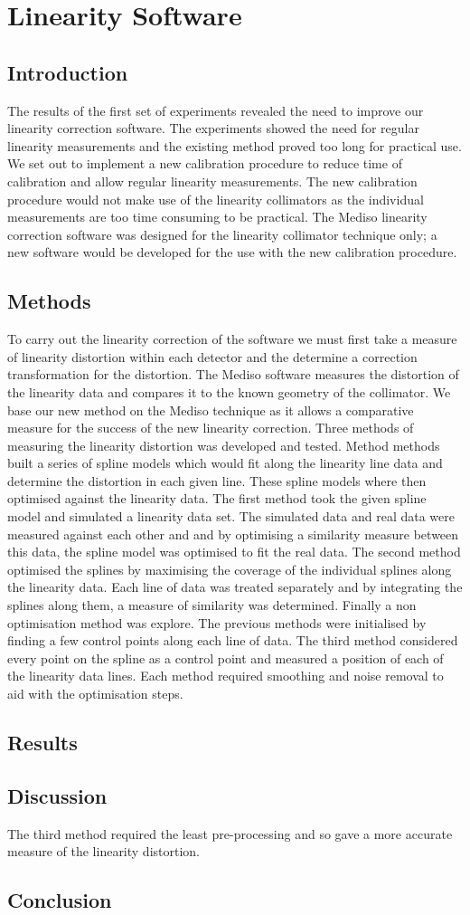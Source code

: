 \chapter{Linearity Software}
\label{chapterlabel}


\section{Introduction}
The results of the first set of experiments revealed the need to improve our linearity correction software. The experiments showed the need for regular linearity measurements and the existing method proved too long for practical use. We set out to implement a new calibration procedure to reduce time of calibration and allow regular linearity measurements. 
The new calibration procedure would not make use of the linearity collimators as the individual measurements are too time consuming to be practical. 
The Mediso linearity correction software was designed for the linearity collimator technique only; a new software would be developed for the use with the new calibration procedure. 
\section{Methods}
To carry out the linearity correction of the software we must first take a measure of linearity distortion within each detector and the determine a correction transformation for the distortion. The Mediso software measures the distortion of the linearity data and compares it to the known geometry of the collimator. We base our new method on the Mediso technique as it allows a comparative measure for the success of the new linearity correction. Three methods of measuring the linearity distortion was developed and tested. Method methods built a series of spline models which would fit along the linearity line data and determine the distortion in each given line. These spline models where then optimised against the linearity data. The first method took the given spline model and simulated a linearity data set. The simulated data and real data were measured against each other and and by optimising a similarity measure between this data, the spline model was optimised to fit the real data.
The second method optimised the splines by maximising the coverage of the individual splines along the linearity data. Each line of data was treated separately and by integrating the splines along them, a measure of similarity was determined. 
Finally a non optimisation method was explore. The previous methods were initialised by finding a few control points along each line of data. The third method considered every point on the spline as a control point and measured a position of each of the linearity data lines. 
Each method required smoothing and noise removal to aid with the optimisation steps. 
\section{Results}

\section{Discussion}
The third method required the least pre-processing and so gave a more accurate measure of the linearity distortion.
\section{Conclusion}